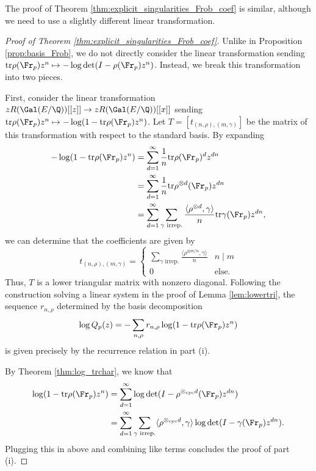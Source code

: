 \documentclass[12pt]{amsart}
\theoremstyle{plain}
\begin{document}
The proof of Theorem \ref{thm:explicit_singularities_Frob_coef} is similar, although we need to use a slightly different linear transformation.

\begin{proof}[Proof of Theorem \ref{thm:explicit_singularities_Frob_coef}]
    Unlike in Proposition \ref{prop:basis_Frob}, we do not directly consider the linear transformation sending ${\rm tr}\rho(\Fr_p) z^n\mapsto -\log\det(I-\rho(\Fr_p)z^n)$. Instead, we break this transformation into two pieces.

    First, consider the linear transformation $zR(\Gal(E/\Q))[[z]]\to zR(\Gal(E/\Q))[[x]]$ sending ${\rm tr}\rho(\Fr_p) z^n\mapsto -\log(1-{\rm tr}\rho(\Fr_p)z^n)$. Let $T=[t_{(n,\rho),(m,\gamma)}]$ be the matrix of this transformation with respect to the standard basis. By expanding
    \begin{align*}
        -\log(1-{\rm tr}\rho(\Fr_p)z^n) &= \sum_{d=1}^{\infty} \frac{1}{n}{\rm tr}\rho(\Fr_p)^dz^{dn}\\
        &=\sum_{d=1}^{\infty} \frac{1}{n}{\rm tr}\rho^{\otimes d}(\Fr_p)z^{dn}\\
        &=\sum_{d=1}^{\infty}\sum_{\gamma\text{ irrep.}}\frac{\langle \rho^{\otimes d},\gamma\rangle}{n}{\rm tr}\gamma(\Fr_p)z^{dn},
    \end{align*}
    we can determine that the coefficients are given by
    \[
        t_{(n,\rho),(m,\gamma)} = \begin{cases}
            \displaystyle \sum_{\gamma\text{ irrep.}}\frac{\langle \rho^{\otimes m/n},\gamma\rangle}{n} & n\mid m\\
            0 & \text{else.}
        \end{cases}
    \]
    Thus, $T$ is a lower triangular matrix with nonzero diagonal. Following the construction solving a linear system in the proof of Lemma \ref{lem:lowertri}, the sequence $r_{n,\rho}$ determined by the basis decomposition
    \[
        \log Q_p(z) = -\sum_{n,\rho}r_{n,\rho}\log(1-{\rm tr}\rho(\Fr_p)z^n)
    \]
    is given precisely by the recurrence relation in part (i).
    
    By Theorem \ref{thm:log_trchar}, we know that
    \begin{align*}
        \log(1-{\rm tr}\rho(\Fr_p)z^n) &= \sum_{d=1}^{\infty} \log\det(I-\rho^{\otimes_{\rm cyc} d}(\Fr_p)z^{dn})\\
        &=\sum_{d=1}^{\infty} \sum_{\gamma\text{ irrep.}}\langle\rho^{\otimes_{\rm cyc} d},\gamma\rangle\log\det(I-\gamma(\Fr_p)z^{dn}).
    \end{align*}
    Plugging this in above and combining like terms concludes the proof of part (i).


\end{proof}
\end{document}
